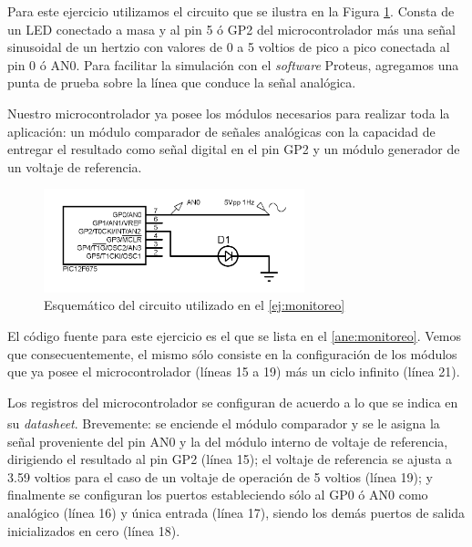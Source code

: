\documentclass[a4paper]{article}
\let\originalcite\cite
\renewcommand{\cite}[2][]{\textsuperscript{\originalcite{#2}}}
\newenvironment{ejercicios}
    {\setcounter{secnumdepth}{3}
    \renewcommand\thesubsection{Ejercicio \arabic{subsection}}}
    {\setcounter{secnumdepth}{0}}
\begin{document}
\begin{Conceptos}
\begin{ejercicios}
    Para este ejercicio utilizamos el circuito que se ilustra en la
    Figura \ref{fig:esquematico1}. Consta de un LED conectado a masa 
    y al pin 5 ó GP2 del microcontrolador más una señal sinusoidal de
    un hertzio con valores de 0 a 5 voltios de pico a pico 
    conectada al pin 0 ó AN0. Para facilitar la simulación con el 
    \textit{software} Proteus, agregamos una punta de prueba sobre la 
    línea que conduce la señal analógica.
    
    Nuestro microcontrolador ya posee los módulos necesarios para 
    realizar toda la aplicación: un módulo comparador de señales 
    analógicas con la capacidad de entregar el resultado como señal 
    digital en el pin GP2 y un módulo generador de un voltaje de 
    referencia.

    \begin{figure}[h]\centering
        \includegraphics[height=3cm]{esquematico1.png}
        \caption{Esquemático del circuito utilizado en el  
        \ref{ej:monitoreo}}\label{fig:esquematico1}
    \end{figure}

    El código fuente para este ejercicio es el que se lista en el 
    \ref{ane:monitoreo}. Vemos que consecuentemente, el mismo sólo
    consiste en la configuración de los módulos que ya posee el 
    microcontrolador (líneas 15 a 19) más un ciclo infinito (línea 21).

    Los registros del microcontrolador se configuran de acuerdo a lo 
    que se indica en su \textit{datasheet}\cite{bid:datasheet}. 
    Brevemente: se enciende el módulo comparador y se le asigna la
    señal proveniente del pin AN0 y la del módulo interno de voltaje 
    de referencia, dirigiendo el resultado al pin GP2 (línea 15); el 
    voltaje de referencia se ajusta a 3.59 voltios para el caso de un
    voltaje de operación de 5 voltios (línea 19); y finalmente se 
    configuran los puertos estableciendo sólo al GP0 ó AN0 como 
    analógico (línea 16) y única entrada (línea 17), siendo los demás
    puertos de salida inicializados en cero (línea 18).


\end{ejercicios}
\end{Conceptos}
\end{document}
